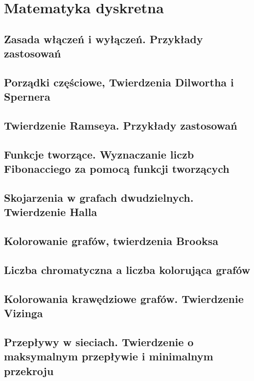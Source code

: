 \chapter{Matematyka dyskretna} 


\section{Zasada włączeń i wyłączeń. Przykłady zastosowań}


\section{Porządki częściowe, Twierdzenia Dilwortha i Spernera}


\section{Twierdzenie Ramseya. Przykłady zastosowań}


\section{Funkcje tworzące. Wyznaczanie liczb Fibonacciego za pomocą funkcji tworzących}


\section{Skojarzenia w grafach dwudzielnych. Twierdzenie Halla}


\section{Kolorowanie grafów, twierdzenia Brooksa}


\section{Liczba chromatyczna a liczba kolorująca grafów}


\section{Kolorowania krawędziowe grafów. Twierdzenie Vizinga}


\section{Przepływy w sieciach. Twierdzenie o maksymalnym przepływie i minimalnym
przekroju}
